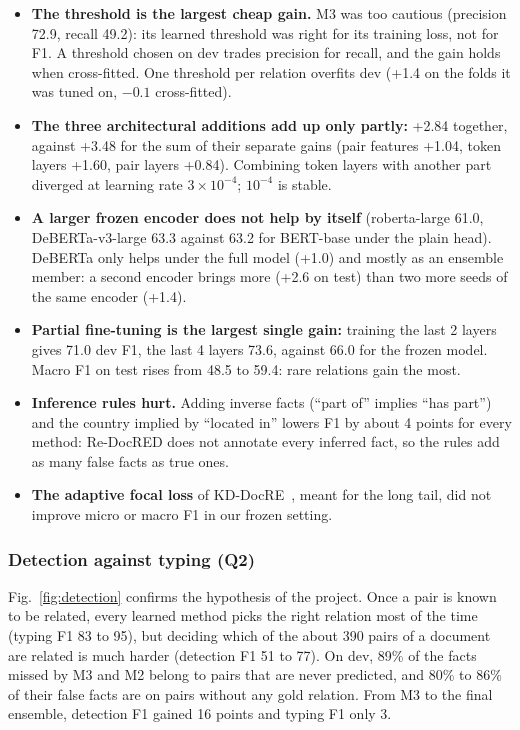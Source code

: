 \documentclass[pdflatex,sn-mathphys-num]{sn-jnl}
\begin{document}
\begin{itemize}
\item \textbf{The threshold is the largest cheap gain.} M3 was too cautious (precision 72.9, recall 49.2): its learned threshold was right for its training loss, not for F1. A threshold chosen on dev trades precision for recall, and the gain holds when cross-fitted. One threshold per relation overfits dev (+1.4 on the folds it was tuned on, $-0.1$ cross-fitted).
\item \textbf{The three architectural additions add up only partly:} +2.84 together, against +3.48 for the sum of their separate gains (pair features +1.04, token layers +1.60, pair layers +0.84). Combining token layers with another part diverged at learning rate $3\times10^{-4}$; $10^{-4}$ is stable.
\item \textbf{A larger frozen encoder does not help by itself} (roberta-large 61.0, DeBERTa-v3-large 63.3 against 63.2 for BERT-base under the plain head). DeBERTa only helps under the full model (+1.0) and mostly as an ensemble member: a second encoder brings more (+2.6 on test) than two more seeds of the same encoder (+1.4).
\item \textbf{Partial fine-tuning is the largest single gain:} training the last 2 layers gives 71.0 dev F1, the last 4 layers 73.6, against 66.0 for the frozen model. Macro F1 on test rises from 48.5 to 59.4: rare relations gain the most.
\item \textbf{Inference rules hurt.} Adding inverse facts (``part of'' implies ``has part'') and the country implied by ``located in'' lowers F1 by about 4 points for every method: Re-DocRED does not annotate every inferred fact, so the rules add as many false facts as true ones.
\item \textbf{The adaptive focal loss} of KD-DocRE~\cite{tan2022kddocre}, meant for the long tail, did not improve micro or macro F1 in our frozen setting.
\end{itemize}

\subsubsection{Detection against typing (Q2)}

Fig.~\ref{fig:detection} confirms the hypothesis of the project. Once a pair is known to be related, every learned method picks the right relation most of the time (typing F1 83 to 95), but deciding which of the about 390 pairs of a document are related is much harder (detection F1 51 to 77). On dev, 89\% of the facts missed by M3 and M2 belong to pairs that are never predicted, and 80\% to 86\% of their false facts are on pairs without any gold relation. From M3 to the final ensemble, detection F1 gained 16 points and typing F1 only 3.
\end{document}
